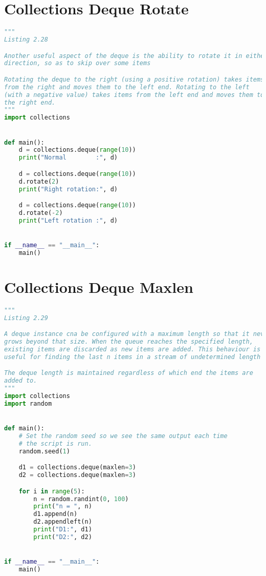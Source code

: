 \documentclass[a4paper,landscape]{report}
\begin{document}
\section{Collections Deque Rotate}
\begin{lstlisting}[language=Python]
"""
Listing 2.28

Another useful aspect of the deque is the ability to rotate it in either
direction, so as to skip over some items

Rotating the deque to the right (using a positive rotation) takes items
from the right and moves them to the left end. Rotating to the left
(with a negative value) takes items from the left end and moves them to
the right end.
"""
import collections


def main():
    d = collections.deque(range(10))
    print("Normal        :", d)

    d = collections.deque(range(10))
    d.rotate(2)
    print("Right rotation:", d)

    d = collections.deque(range(10))
    d.rotate(-2)
    print("Left rotation :", d)


if __name__ == "__main__":
    main()

\end{lstlisting}
\section{Collections Deque Maxlen}
\begin{lstlisting}[language=Python]
"""
Listing 2.29

A deque instance cna be configured with a maximum length so that it never
grows beyond that size. When the queue reaches the specified length,
existing items are discarded as new items are added. This behaviour is
useful for finding the last n items in a stream of undetermined length

The deque length is maintained regardless of which end the items are
added to.
"""
import collections
import random


def main():
    # Set the random seed so we see the same output each time
    # the script is run.
    random.seed(1)

    d1 = collections.deque(maxlen=3)
    d2 = collections.deque(maxlen=3)

    for i in range(5):
        n = random.randint(0, 100)
        print("n = ", n)
        d1.append(n)
        d2.appendleft(n)
        print("D1:", d1)
        print("D2:", d2)


if __name__ == "__main__":
    main()

\end{lstlisting}
\end{document}
